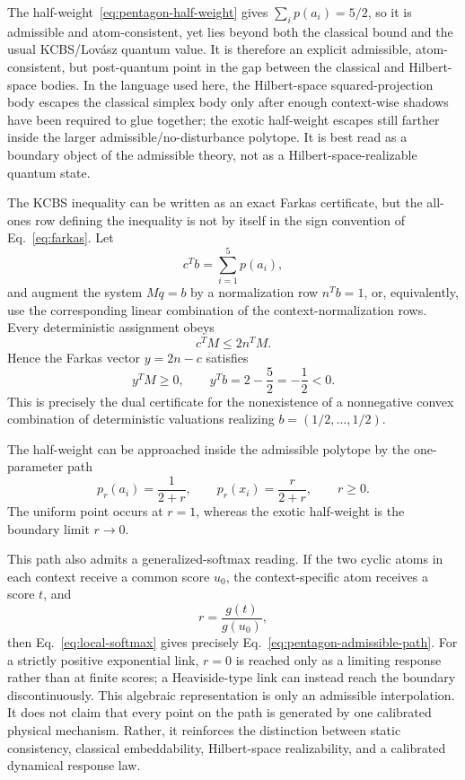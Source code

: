 \documentclass[aps,pra,reprint,superscriptaddress,nofootinbib,floatfix]{revtex4-2}
\begin{document}
The half-weight~\eqref{eq:pentagon-half-weight} gives
\(\sum_i p(a_i)=5/2\), so it is admissible and atom-consistent, yet lies
beyond both the classical bound and the usual KCBS/Lov\'asz quantum value.
It is therefore an explicit admissible, atom-consistent, but post-quantum
point in the gap between the classical and Hilbert-space bodies.  In the
language used here, the Hilbert-space squared-projection body escapes the
classical simplex body only after enough context-wise shadows have been
required to glue together; the exotic half-weight escapes still farther
inside the larger admissible/no-disturbance polytope.  It is best read as a
boundary object of the admissible theory, not as a Hilbert-space-realizable
quantum state.

The KCBS inequality can be written as an exact Farkas certificate, but the
all-ones row defining the inequality is not by itself in the sign convention
of Eq.~\eqref{eq:farkas}.  Let
\[
        c^Tb=\sum_{i=1}^5 p(a_i),
\]
and augment the system \(Mq=b\) by a normalization row \(n^Tb=1\), or,
equivalently, use the corresponding linear combination of the
context-normalization rows.  Every deterministic assignment obeys
\[
        c^TM\le 2n^TM.
\]
Hence the Farkas vector \(y=2n-c\) satisfies
\begin{equation}
        y^TM\ge 0,\qquad
        y^Tb=2-\frac52=-\frac12<0.
        \label{eq:pentagon-farkas-certificate}
\end{equation}
This is precisely the dual certificate for the nonexistence of a nonnegative
convex combination of deterministic valuations realizing
\(b=(1/2,\ldots,1/2)\).

The half-weight can be approached inside the admissible polytope by the
one-parameter path
\begin{equation}
        p_r(a_i)=\frac{1}{2+r},\qquad
        p_r(x_i)=\frac{r}{2+r},\qquad r\ge 0.
        \label{eq:pentagon-admissible-path}
\end{equation}
The uniform point occurs at \(r=1\), whereas the exotic half-weight is the
boundary limit \(r\to0\).

This path also admits a generalized-softmax reading.  If the two cyclic atoms
in each context receive a common score \(u_0\), the context-specific atom
receives a score \(t\), and
\[
        r=\frac{g(t)}{g(u_0)},
\]
then Eq.~\eqref{eq:local-softmax} gives precisely
Eq.~\eqref{eq:pentagon-admissible-path}.  For a strictly positive exponential
link, \(r=0\) is reached only as a limiting response rather than at finite
scores; a Heaviside-type link can instead reach the boundary
discontinuously.  This algebraic representation is only an admissible
interpolation.  It does not claim that every point on the path is generated
by one calibrated physical mechanism.  Rather, it reinforces the distinction
between static consistency, classical embeddability, Hilbert-space
realizability, and a calibrated dynamical response law.
\end{document}

